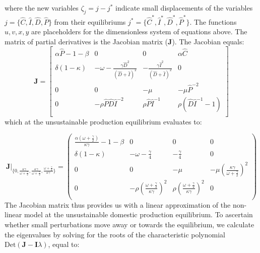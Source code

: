 \documentclass[12pt]{article}
\begin{document}
%
where the new variables $\zeta_{j} = j - j^{*}$ indicate small displacements of the variables $j = \{\hat{C}, \hat{I}, \hat{D}, \hat{P}\}$ from their equilibriums $j^{*} = \{\hat{C}^{*}, \hat{I}^{*}, \hat{D}^{*}, \hat{P}^{*}\}$. The functions $u, v, x, y$ are placeholders for the dimensionless system of equations above. The matrix of partial derivatives is the Jacobian matrix ($\boldsymbol{J}$). The Jacobian equals:
%
\begin{equation}
  \boldsymbol{J} =
  \begin{bmatrix}
    \alpha \hat{P} - 1 -\beta &
    0 &
    0 &
    \alpha \hat{C}\\
    \delta ( 1 - \kappa) &
    -\omega - \frac{\gamma \hat{D}^2}{(\hat{D} + \hat{I})^2} &
    - \frac{\gamma \hat{I}^2}{ (\hat{D} + \hat{I})^2} &
    0 \\
    0 &
    0 &
    -\mu &
    -\mu \hat{P}^{-2} \\
    0 &
    -\rho \hat{P} \hat{D} \hat{I}^{-2} &
    \rho \hat{P} \hat{I}^{-1} &
    \rho (\hat{D} \hat{I}^{-1} - 1) \\
  \end{bmatrix}
\end{equation}
%
which at the unsustainable production equilibrium evaluates to:

\begin{equation}
  \boldsymbol{J} \Big |_{\big \{0, \frac{\kappa \gamma}{\omega + \frac{\gamma}{2}}, \frac{\kappa \gamma}{\omega + \frac{\gamma}{2}}, \frac{\omega + \frac{\gamma}{2}}{\kappa \gamma}\big \}} =
  \begin{pmatrix}
    \frac{\alpha(\omega + \frac{\gamma}{2})}{\kappa \gamma} - 1 - \beta   &    0     &     0    &  0 \\
    \delta (1 - \kappa) & - \omega - \frac{\gamma}{4}  &  - \frac{\gamma}{4} & 0 \\
    0      &           0            & -\mu     & - \mu (\frac{\kappa \gamma}{\omega + \frac{\gamma}{2}})^2\\
    0      &   - \rho (\frac{\omega + \frac{\gamma}{2}}{\kappa \gamma})^2    & \rho (\frac{\omega + \frac{\gamma}{2}}{\kappa \gamma})^2 & 0 \\
  \end{pmatrix}
\end{equation}
%
The Jacobian matrix thus provides us with a linear approximation of the non-linear model at the unsustainable domestic production equilibrium. To ascertain whether small perturbations move away or towards the equilibrium, we calculate the eigenvalues by solving for the roots of the characteristic polynomial $\text{Det}(\mathbf{J} - \mathbf{I}\lambda)$, equal to:
\end{document}
